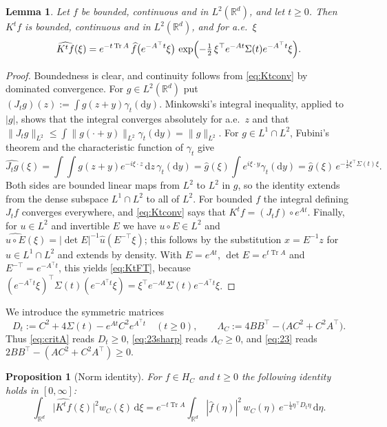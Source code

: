 \documentclass[11pt]{amsart}
\numberwithin{equation}{section}
\newtheorem{proposition}[theorem]{Proposition}
\newtheorem{lemma}[theorem]{Lemma}
\theoremstyle{definition}
\theoremstyle{remark}
\newcommand{\R}{\mathbb{R}}
\newcommand{\Tr}{\operatorname{Tr}}
\newcommand{\dd}{\,\mathrm{d}}
\newcommand{\hatf}[1]{\widehat{#1}}
\newcommand{\tp}{\top}
\begin{document}
\begin{lemma}\label{lem:Kt}
Let $f$ be bounded, continuous and in $L^2(\R^d)$, and let $t\ge0$. Then $K^tf$ is bounded, continuous and in
$L^2(\R^d)$, and for a.e.\ $\xi$
\begin{equation}\label{eq:KtFT}
\hatf{K^tf}(\xi)=e^{-t\Tr A}\,\hatf f\bigl(e^{-A^\tp t}\xi\bigr)\,
\exp\Bigl(-\tfrac12\,\xi^\tp e^{-At}\Sigma(t)e^{-A^\tp t}\xi\Bigr).
\end{equation}
\end{lemma}

\begin{proof}
Boundedness is clear, and continuity follows from \eqref{eq:Ktconv} by dominated convergence. For $g\in L^2(\R^d)$ put
$(J_tg)(z):=\int g(z+y)\gamma_t(\mathrm dy)$. Minkowski's integral inequality, applied to $|g|$, shows that the integral
converges absolutely for a.e.\ $z$ and that $\|J_tg\|_{L^2}\le\int\|g(\cdot+y)\|_{L^2}\gamma_t(\mathrm dy)=\|g\|_{L^2}$.
For $g\in L^1\cap L^2$, Fubini's theorem and the characteristic function of $\gamma_t$ give
\[
\hatf{J_tg}(\xi)=\int\!\!\int g(z+y)e^{-i\xi\cdot z}\dd z\,\gamma_t(\mathrm dy)=\hatf g(\xi)\int e^{i\xi\cdot y}\gamma_t(\mathrm dy)
=\hatf g(\xi)\,e^{-\frac12\xi^\tp\Sigma(t)\xi}.
\]
Both sides are bounded linear maps from $L^2$ to $L^2$ in $g$, so the identity extends from the dense subspace
$L^1\cap L^2$ to all of $L^2$. For bounded $f$ the integral defining $J_tf$ converges everywhere, and
\eqref{eq:Ktconv} says that $K^tf=(J_tf)\circ e^{At}$. Finally, for $u\in L^2$ and invertible $E$ we have
$u\circ E\in L^2$ and $\hatf{u\circ E}(\xi)=|\det E|^{-1}\hatf u(E^{-\tp}\xi)$; this follows by the substitution
$x=E^{-1}z$ for $u\in L^1\cap L^2$ and extends by density. With $E=e^{At}$, $\det E=e^{t\Tr A}$ and
$E^{-\tp}=e^{-A^\tp t}$, this yields \eqref{eq:KtFT}, because
$(e^{-A^\tp t}\xi)^\tp\Sigma(t)(e^{-A^\tp t}\xi)=\xi^\tp e^{-At}\Sigma(t)e^{-A^\tp t}\xi$.
\end{proof}

We introduce the symmetric matrices
\begin{equation}\label{eq:Dt}
D_t:=C^2+4\Sigma(t)-e^{At}C^2e^{A^\tp t}\quad(t\ge0),\qquad
\Lambda_C:=4BB^\tp-\bigl(AC^2+C^2A^\tp\bigr).
\end{equation}
Thus \eqref{eq:critA} reads $D_t\ge0$, \eqref{eq:23sharp} reads $\Lambda_C\ge0$, and \eqref{eq:23} reads
$2BB^\tp-(AC^2+C^2A^\tp)\ge0$.

\begin{proposition}[Norm identity]\label{prop:norm}
For $f\in H_C$ and $t\ge0$ the following identity holds in $[0,\infty]$:
\begin{equation}\label{eq:normid}
\int_{\R^d}\bigl|\hatf{K^tf}(\xi)\bigr|^2w_C(\xi)\dd\xi
=e^{-t\Tr A}\int_{\R^d}|\hatf f(\eta)|^2\,w_C(\eta)\,e^{-\frac14\eta^\tp D_t\eta}\dd\eta .
\end{equation}
\end{proposition}
\end{document}
